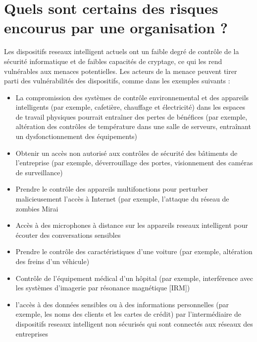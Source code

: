 \documentclass[12pt]{report}
\begin{document}
\hypertarget{quels-sont-certains-des-risques-encourus-par-une-organisation}{%
      \section{\texorpdfstring{Quels sont certains des risques encourus par
              une organisation ?
        }{Quels sont certains des risques encourus par une organisation ? }}\label{quels-sont-certains-des-risques-encourus-par-une-organisation}}

Les dispositifs reseaux intelligent actuels ont un faible degré de contrôle de la
sécurité informatique et de faibles capacités de cryptage, ce qui les
rend vulnérables aux menaces potentielles. Les acteurs de la menace
peuvent tirer parti des vulnérabilités des dispositifs, comme dans les
exemples suivants :

\begin{itemize}
      \item
            La compromission des systèmes de contrôle environnemental et des
            appareils intelligents (par exemple, cafetière, chauffage et
            électricité) dans les espaces de travail physiques pourrait entraîner
            des pertes de bénéfices (par exemple, altération des contrôles de
            température dans une salle de serveurs, entraînant un
            dysfonctionnement des équipements)
      \item
            Obtenir un accès non autorisé aux contrôles de sécurité des bâtiments
            de l'entreprise (par exemple, déverrouillage des portes, visionnement
            des caméras de surveillance)
      \item
            Prendre le contrôle des appareils multifonctions pour perturber
            malicieusement l'accès à Internet (par exemple, l'attaque du réseau de
            zombies Mirai
      \item
            Accès à des microphones à distance sur les appareils reseaux intelligent pour écouter
            des conversations sensibles
      \item
            Prendre le contrôle des caractéristiques d'une voiture (par exemple,
            altération des freins d'un véhicule)
      \item
            Contrôle de l'équipement médical d'un hôpital (par exemple,
            interférence avec les systèmes d'imagerie par résonance magnétique
            {[}IRM{]})
      \item
            l'accès à des données sensibles ou à des informations personnelles
            (par exemple, les noms des clients et les cartes de crédit) par
            l'intermédiaire de dispositifs reseaux intelligent non sécurisés qui sont connectés
            aux réseaux des entreprises
\end{itemize}
\end{document}
